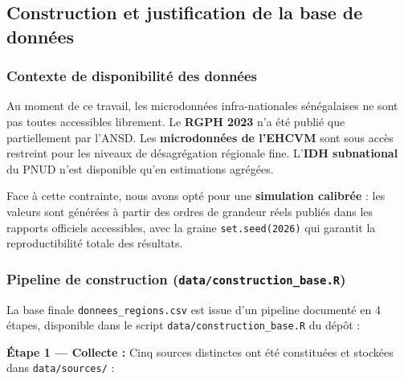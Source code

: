\documentclass[
]{article}
\begin{document}
\subsection{Construction et justification de la base de
données}\label{construction-et-justification-de-la-base-de-donnuxe9es}

\subsubsection{Contexte de disponibilité des
données}\label{contexte-de-disponibilituxe9-des-donnuxe9es}

Au moment de ce travail, les microdonnées infra-nationales sénégalaises
ne sont pas toutes accessibles librement. Le \textbf{RGPH 2023} n'a été
publié que partiellement par l'ANSD. Les \textbf{microdonnées de
l'EHCVM} sont sous accès restreint pour les niveaux de désagrégation
régionale fine. L'\textbf{IDH subnational} du PNUD n'est disponible
qu'en estimations agrégées.

Face à cette contrainte, nous avons opté pour une \textbf{simulation
calibrée} : les valeurs sont générées à partir des ordres de grandeur
réels publiés dans les rapports officiels accessibles, avec la graine
\texttt{set.seed(2026)} qui garantit la reproductibilité totale des
résultats.

\subsubsection{\texorpdfstring{Pipeline de construction
(\texttt{data/construction\_base.R})}{Pipeline de construction (data/construction\_base.R)}}\label{pipeline-de-construction-dataconstruction_base.r}

La base finale \texttt{donnees\_regions.csv} est issue d'un pipeline
documenté en 4 étapes, disponible dans le script
\texttt{data/construction\_base.R} du dépôt :

\textbf{Étape 1 --- Collecte :} Cinq sources distinctes ont été
constituées et stockées dans \texttt{data/sources/} :
\end{document}
